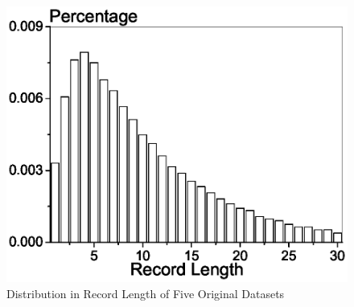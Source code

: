 \begin{figure}[th]
{\begin{minipage}[c]{0.46\textwidth}
  \includegraphics[width=1.0\columnwidth]{retail.eps}
\end{minipage}%
}
\caption{Distribution in Record Length of Five Original Datasets}\label{fig:datasets}
\end{figure}


